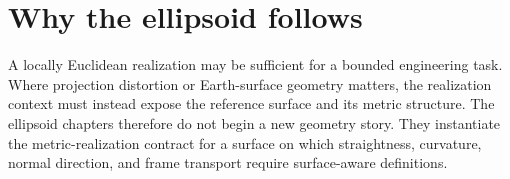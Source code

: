 \section{Why the ellipsoid follows}

A locally Euclidean realization may be sufficient for a bounded
engineering task. Where projection distortion or Earth-surface geometry
matters, the realization context must instead expose the reference
surface and its metric structure. The ellipsoid chapters therefore do
not begin a new geometry story. They instantiate the metric-realization
contract for a surface on which straightness, curvature, normal
direction, and frame transport require surface-aware definitions.
